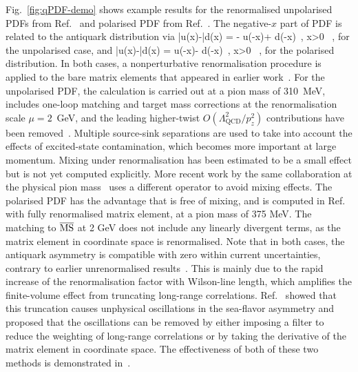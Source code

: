 Fig.~\ref{fig:qPDF-demo} shows example results for the renormalised unpolarised PDFs from Ref.~\cite{Chen:2017mzz} and polarised PDF from Ref.~\cite{Alexandrou:2017huk}.
The negative-$x$ part of PDF is related to the antiquark distribution via
\be
\bar{u}(x)-\bar{d}(x) = - u(-x)+ d(-x)\, , \qquad {} \quad x>0 \, ,
\ee
for the unpolarised case, and
\be
\Delta\bar{u}(x)-\Delta\bar{d}(x) =  \Delta u(-x)- \Delta d(-x)\, , \qquad {} \quad x>0 \, ,
\ee
for the polarised distribution. 
In both cases, a nonperturbative renormalisation procedure is applied to the bare matrix elements that appeared in earlier work~\cite{Lin:2014zya,Alexandrou:2015rja,Chen:2016utp,Alexandrou:2016jqi,Alexandrou:2016eyt}.
%
For the unpolarised PDF, the calculation is carried out at a pion mass of 310~MeV, includes one-loop matching and target mass corrections at the renormalisation scale $\mu=2$~GeV, and the leading higher-twist $O(\Lambda_\text{QCD}^2/p_z^2)$ contributions have been removed~\cite{Chen:2016utp}. Multiple source-sink separations are used to take into account the effects of excited-state contamination, which becomes more important at large momentum. Mixing under renormalisation has been estimated to be a small effect but is not yet computed explicitly. More recent work by the same collaboration at the physical pion mass~\cite{Lin:2017ani} uses a different operator to avoid mixing effects. 
%
The polarised PDF has the advantage that is free of mixing, and is computed in
Ref.~\cite{Alexandrou:2017huk}  with fully renormalised matrix element, 
at a pion mass of 375 MeV. The matching to $\overline{\rm MS}$ at 2 GeV 
does not include any linearly divergent terms, as the matrix element in 
coordinate space is renormalised.
% 
Note that in both cases, the antiquark asymmetry is compatible with zero within current uncertainties, contrary to earlier unrenormalised results~\cite{Lin:2014zya,Alexandrou:2015rja,Chen:2016utp,Alexandrou:2016eyt}.
This is mainly due to the rapid increase
of the renormalisation factor with Wilson-line length, which amplifies the finite-volume effect from truncating long-range correlations. Ref.~\cite{Lin:2017ani} showed that this truncation causes unphysical oscillations in the sea-flavor asymmetry and proposed that the oscillations can be removed by either imposing a filter to reduce the weighting of long-range correlations or by taking the derivative of the matrix element in coordinate space. The effectiveness of both of these two methods is demonstrated in~\cite{Lin:2017ani}. 

